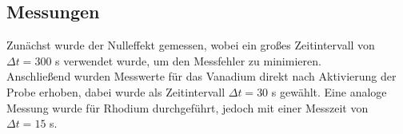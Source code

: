 \documentclass{scrartcl}
\begin{document}
\subsection{Messungen}
Zunächst wurde der Nulleffekt gemessen, wobei ein großes Zeitintervall von $\Delta t=300$ s verwendet wurde, um den Messfehler zu minimieren. \\
Anschließend wurden Messwerte für das Vanadium direkt nach Aktivierung der Probe erhoben, dabei wurde als Zeitintervall $\Delta t=30$ s gewählt. Eine analoge Messung wurde für Rhodium durchgeführt, jedoch mit einer Messzeit von $\Delta t=15$ s.  
\end{document}
